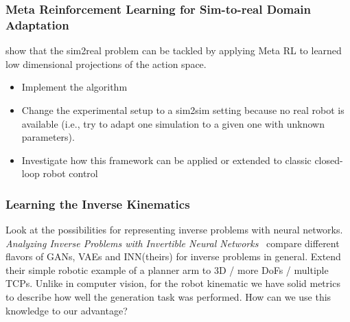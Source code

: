 \documentclass[a4paper]{article}
\begin{document}
\subsubsection{Meta Reinforcement Learning for Sim-to-real Domain Adaptation}
\cite{Arndt19} show that the sim2real problem can be tackled by applying Meta RL to learned low dimensional projections of the action space.
\begin{itemize}
  \item Implement the algorithm
  \item Change the experimental setup to a sim2sim setting because no real robot is available (i.e., try to adapt one simulation to a given one with unknown parameters).
  \item Investigate how this framework can be applied or extended to classic closed-loop robot control
\end{itemize}


\subsubsection{Learning the Inverse Kinematics}
Look at the possibilities for representing inverse problems with neural networks.
\textit{Analyzing Inverse Problems with Invertible Neural Networks}~\cite{Ardizzone2018}
compare different flavors of GANs, VAEs and INN(theirs) for inverse problems in general.
Extend their simple robotic example of a planner arm to 3D / more DoFs / multiple TCPs.
Unlike in computer vision, for the robot kinematic we have solid metrics to describe how well the generation task was performed.
How can we use this knowledge to our advantage?
\end{document}
